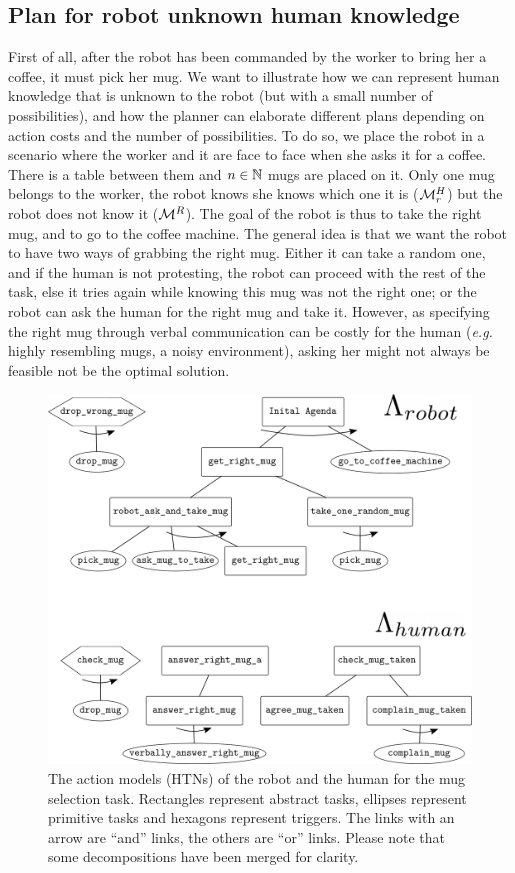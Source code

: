 \documentclass[a4paper,11pt,twoside]{StyleThese}
\begin{document}
\subsection{Plan for robot unknown human knowledge}
First of all, after the robot has been commanded by the worker to bring her a coffee, it must pick her mug. We want to illustrate how we can represent human knowledge that is unknown to the robot (but with a small number of possibilities), and how the planner can elaborate different plans depending on action costs and the number of possibilities. To do so, we place the robot in a scenario where the worker and it are face to face when she asks it for a coffee. There is a table between them and $n \in \mathbb{N}$ mugs are placed on it. Only one mug belongs to the worker, the robot knows she knows which one it is ($\mathcal{M}^H_r$) but the robot does not know it ($\mathcal{M}^R$). The goal of the robot is thus to take the right mug, and to go to the coffee machine. The general idea is that we want the robot to have two ways of grabbing the right mug. Either it can take a random one, and if the human is not protesting, the robot can proceed with the rest of the task, else it tries again while knowing this mug was not the right one; or the robot can ask the human for the right mug and take it. However, as specifying the right mug through verbal communication can be costly for the human (\textit{e.g.} highly resembling mugs, a noisy environment), asking her might not always be feasible not be the optimal solution.

\begin{figure}[hbtp]
\centering
\includegraphics[width=\textwidth]{figures/chapter4/HTN_hr_mugs.png}
\caption{The action models (HTNs) of the robot and the human for the mug selection task. Rectangles represent abstract tasks, ellipses represent primitive tasks and hexagons represent triggers. The links with an arrow are ``and'' links, the others are ``or'' links. Please note that some decompositions have been merged for clarity.}
\label{fig:chap4rhhtnmug}
\end{figure}
\end{document}
